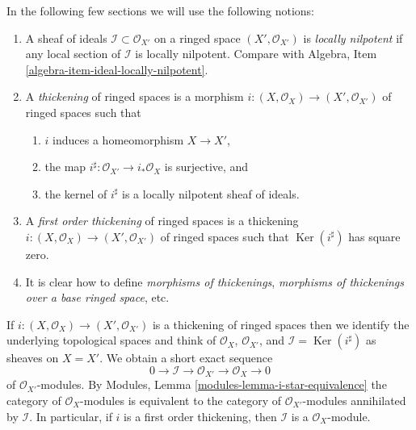 \documentclass{stacks-project}
\theoremstyle{plain}
\theoremstyle{definition}
\theoremstyle{remark}
\numberwithin{equation}{subsection}
\def\Ker{\mathop{\mathrm{Ker}}}
\begin{document}
\noindent
In the following few sections we will use the following notions:
\begin{enumerate}
\item A sheaf of ideals $\mathcal{I} \subset \mathcal{O}_{X'}$ on
a ringed space $(X', \mathcal{O}_{X'})$ is {\it locally nilpotent}
if any local section of $\mathcal{I}$ is locally nilpotent.
Compare with Algebra, Item \ref{algebra-item-ideal-locally-nilpotent}.
\item A {\it thickening} of ringed spaces is a morphism
$i : (X, \mathcal{O}_X) \to (X', \mathcal{O}_{X'})$ of ringed spaces
such that
\begin{enumerate}
\item $i$ induces a homeomorphism $X \to X'$,
\item the map $i^\sharp : \mathcal{O}_{X'} \to i_*\mathcal{O}_X$
is surjective, and
\item the kernel of $i^\sharp$ is a locally nilpotent sheaf of ideals.
\end{enumerate}
\item A {\it first order thickening} of ringed spaces is a thickening
$i : (X, \mathcal{O}_X) \to (X', \mathcal{O}_{X'})$ of ringed spaces
such that $\Ker(i^\sharp)$ has square zero.
\item It is clear how to define {\it morphisms of thickenings},
{\it morphisms of thickenings over a base ringed space}, etc.
\end{enumerate}
If $i : (X, \mathcal{O}_X) \to (X', \mathcal{O}_{X'})$ is a thickening
of ringed spaces then we identify the underlying topological spaces
and think of $\mathcal{O}_X$, $\mathcal{O}_{X'}$, and
$\mathcal{I} = \Ker(i^\sharp)$ as sheaves on $X = X'$. We obtain
a short exact sequence
$$
0 \to \mathcal{I} \to \mathcal{O}_{X'} \to \mathcal{O}_X \to 0
$$
of $\mathcal{O}_{X'}$-modules. By
Modules, Lemma \ref{modules-lemma-i-star-equivalence}
the category of $\mathcal{O}_X$-modules is equivalent to the category
of $\mathcal{O}_{X'}$-modules annihilated by $\mathcal{I}$. In particular,
if $i$ is a first order thickening, then
$\mathcal{I}$ is a $\mathcal{O}_X$-module.
\end{document}
